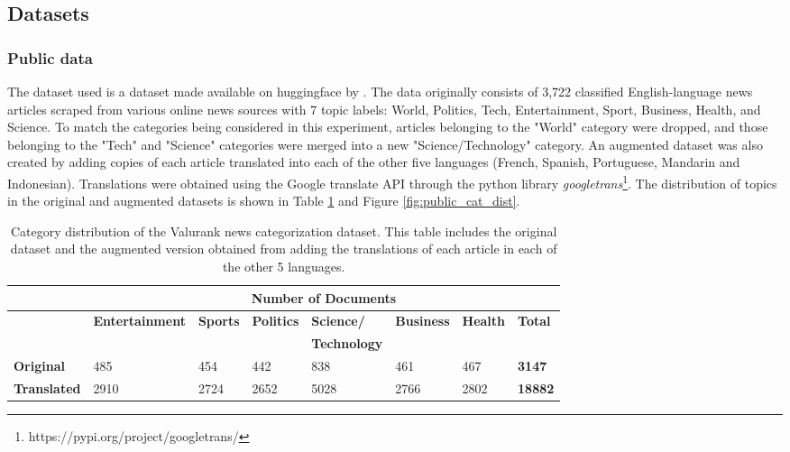 \documentclass{l4proj}
\begin{document}
\subsection{Datasets}
\label{section:datasets}
\subsubsection{Public data} \hfill \par
The dataset used is a dataset made available on huggingface by \cite{valurankdata}. The data originally consists of 3,722 classified English-language news articles scraped from various online news sources with 7 topic labels: World, Politics, Tech, Entertainment, Sport, Business, Health, and Science. To match the categories being considered in this experiment, articles belonging to the "World" category were dropped, and those belonging to the "Tech" and "Science" categories were merged into a new "Science/Technology" category. An augmented dataset was also created by adding copies of each article translated into each of the other five languages (French, Spanish, Portuguese, Mandarin and Indonesian). Translations were obtained using the Google translate API through the python library \emph{googletrans}\footnote{https://pypi.org/project/googletrans/}. The distribution of topics in the original and augmented datasets is shown in Table \ref{table:valurankstats} and Figure \ref{fig:public_cat_dist}.

\begin{table}[h]
\begin{tabular}{llllllll}
\hline
\multicolumn{1}{c}{\textbf{}} & \multicolumn{7}{c}{\textbf{Number of Documents}}                                                                                          \\ \hline
                              & \textbf{Entertainment} & \textbf{Sports} & \textbf{Politics} & \textbf{Science/}   & \textbf{Business} & \textbf{Health} & \textbf{Total} \\
                              & \textbf{}              &                 &                   & \textbf{Technology} & \textbf{}         & \textbf{}       &                \\ \hline
\textbf{Original}             & 485                    & 454             & 442               & 838                 & 461               & 467             & \textbf{3147}  \\
\textbf{Translated}           & 2910                   & 2724            & 2652              & 5028                & 2766              & 2802            & \textbf{18882} \\ \hline
\end{tabular}
\caption{Category distribution of the Valurank news categorization dataset. This table includes the original dataset and the augmented version obtained from adding the translations of each article in each of the other 5 languages.}
\label{table:valurankstats}
\end{table}
\end{document}
